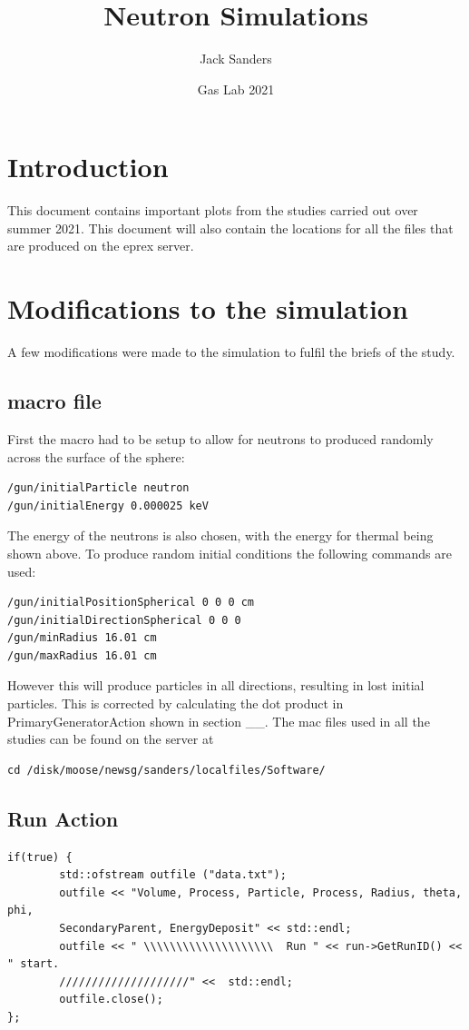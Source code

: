 \documentclass[a4paper]{article}
\title{Neutron Simulations}
\author{Jack Sanders }
\date{Gas Lab 2021}
\begin{document}
\maketitle
\tableofcontents
\section{Introduction}
This document contains important plots from the studies carried out over summer 2021. This document will also contain the locations for all the files that are produced on the eprex server.

\section{Modifications to the simulation}
A few modifications were made to the simulation to fulfil the briefs of the study.
\subsection{macro file}
First the macro had to be setup to allow for neutrons to produced randomly across the surface of the sphere:
\begin{verbatim}
/gun/initialParticle neutron
/gun/initialEnergy 0.000025 keV
\end{verbatim}
The energy of the neutrons is also chosen, with the energy for thermal being shown above. To produce random initial conditions the following commands are used:
\begin{verbatim}
/gun/initialPositionSpherical 0 0 0 cm
/gun/initialDirectionSpherical 0 0 0
/gun/minRadius 16.01 cm
/gun/maxRadius 16.01 cm
\end{verbatim}
However this will produce particles in all directions, resulting in lost initial particles. This is corrected by calculating the dot product in PrimaryGeneratorAction shown in section \_\_.
The mac files used in all the studies can be found on the server at 
\begin{verbatim}
cd /disk/moose/newsg/sanders/localfiles/Software/
\end{verbatim}
\subsection{Run Action}
\begin{verbatim}
if(true) {
        std::ofstream outfile ("data.txt");
        outfile << "Volume, Process, Particle, Process, Radius, theta, phi, 
        SecondaryParent, EnergyDeposit" << std::endl;
        outfile << " \\\\\\\\\\\\\\\\\\\\  Run " << run->GetRunID() << " start. 
        ////////////////////" <<  std::endl;
        outfile.close();
};

\end{verbatim}
\end{document}
